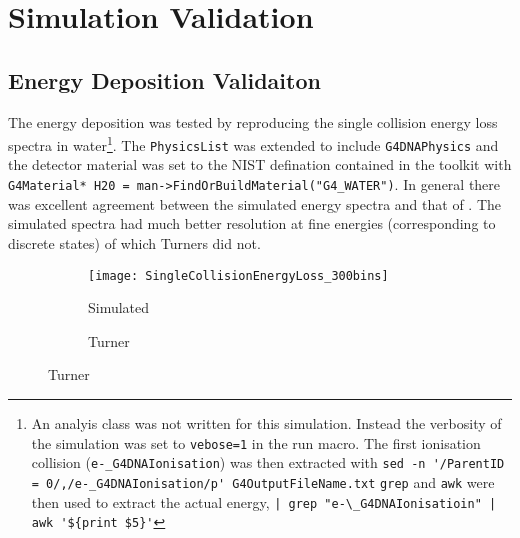 \section{Simulation Validation}
\label{sec:SimValidation}

\subsection{Energy Deposition Validaiton}
The energy deposition was tested by reproducing the single collision energy loss spectra in water\footnote{%
An analyis class was not written for this simulation. 
Instead the verbosity of the simulation was set to \verb+vebose=1+ in the run macro.
The first ionisation collision (\verb+e-_G4DNAIonisation+) was then extracted with \verb+sed -n '/ParentID = 0/,/e-_G4DNAIonisation/p' G4OutputFileName.txt+ \verb+grep+ and \verb+awk+ were then used to extract the actual energy, \verb+| grep "e-\_G4DNAIonisatioin" | awk '${print $5}'+ %
}.
The \verb+PhysicsList+ was extended to include \verb+G4DNAPhysics+ and the detector material was set to the NIST defination contained in the toolkit with \verb+G4Material* H20 = man->FindOrBuildMaterial("G4_WATER")+.
In general there was excellent agreement between the simulated energy spectra and that of \cite{turner}.
The simulated spectra had much better resolution at fine energies (corresponding to discrete states) of which Turners did not.
\begin{figure}
    \centering
    \caption{Single Collision Energy Loss of Water}
    \begin{subfigure}[b]{0.45\figurewidth}
        \texttt{[image: SingleCollisionEnergyLoss\_300bins]}
        \caption{Simulated}
    \end{subfigure}
    \begin{subfigure}[b]{0.45\figurewidth}
        \caption{Turner}
    \end{subfigure}
\end{figure}
